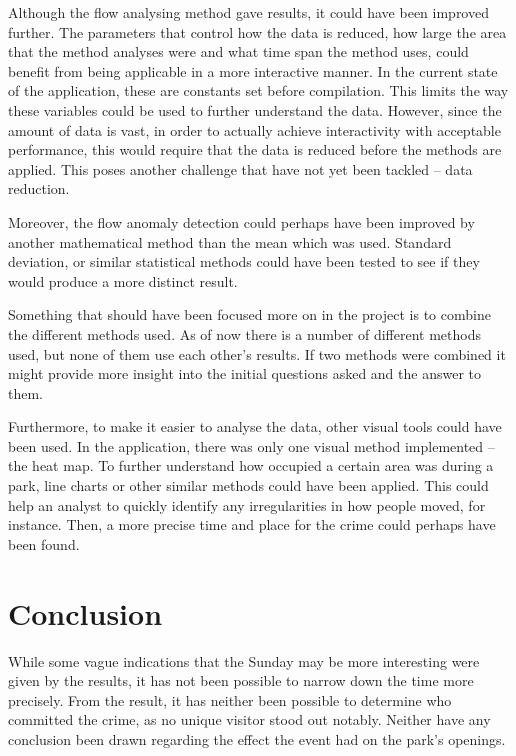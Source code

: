 \documentclass[journal]{vgtc}                %
\begin{document}
Although the flow analysing method gave results, it could have been improved further. The parameters that control how the data is reduced, how large the area that the method analyses were and what time span the method uses, could benefit from being applicable in a more interactive manner. In the current state of the application, these are constants set before compilation. This limits the way these variables could be used to further understand the data. However, since the amount of data is vast, in order to actually achieve interactivity with acceptable performance, this would require that the data is reduced before the methods are applied. This poses another challenge that have not yet been tackled – data reduction.

Moreover, the flow anomaly detection could perhaps have been improved by another mathematical method than the mean which was used. Standard deviation, or similar statistical methods could have been tested to see if they would produce a more distinct result.

Something that should have been focused more on in the project is to combine the different methods used. As of now there is a number of different methods used, but none of them use each other's results. If two methods were combined it might provide more insight into the initial questions asked and the answer to them.

Furthermore, to make it easier to analyse the data, other visual tools could have been used. In the application, there was only one visual method implemented – the heat map. To further understand how occupied a certain area was during a park, line charts or other similar methods could have been applied. This could help an analyst to quickly identify any irregularities in how people moved, for instance. Then, a more precise time and place for the crime could perhaps have been found.


\section{Conclusion}
While some vague indications that the Sunday may be more interesting were given by the results, it has not been possible to narrow down the time more precisely. From the result, it has neither been possible to determine who committed the crime, as no unique visitor stood out notably. Neither have any conclusion been drawn regarding the effect the event had on the park’s openings.

\appendix
\onecolumn
\end{document}
